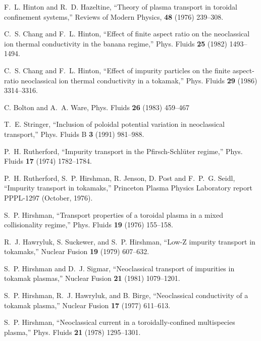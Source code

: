 \begin{thebibliography}{99}

  F.~L. Hinton and R.~D. Hazeltine,
``Theory of plasma transport in toroidal confinement systems,''
Reviews of Modern Physics, {\bf 48} (1976) 239--308.

 C.~S. Chang and F.~L. Hinton,
``Effect of finite aspect ratio on the neoclassical ion thermal 
conductivity in the banana regime,'' 
Phys. Fluids {\bf 25} (1982) 1493--1494.

 C.~S. Chang and F.~L. Hinton,
``Effect of impurity particles on the finite aspect-ratio neoclassical
ion thermal conductivity in a tokamak,''
Phys. Fluids {\bf 29} (1986) 3314--3316.

 C. Bolton and A.~A. Ware,
Phys. Fluids {\bf 26} (1983) 459--467

 T.~E. Stringer,
``Inclusion of poloidal potential variation in neoclassical transport,''
Phys. Fluids B {\bf 3} (1991) 981--988.

 P.~H. Rutherford,
``Impurity transport in the Pfirsch-Schl\"{u}ter regime,''
Phys. Fluids {\bf 17} (1974) 1782--1784.

 P.~H. Rutherford, S.~P. Hirshman, R. Jenson,
D. Post and F.~P.~G. Seidl,
``Impurity transport in tokamaks,''
Princeton Plasma Physics Laboratory report PPPL-1297
(October, 1976).

 S.~P. Hirshman,
``Transport properties of a toroidal plasma in a mixed 
collisionality regime,''
Phys. Fluids {\bf 19} (1976) 155--158.

 R.~J. Hawryluk, S. Suckewer, and S.~P. Hirshman,
``Low-Z impurity transport in tokamaks,''
Nuclear Fusion {\bf 19} (1979) 607--632.

 S.~P. Hirshman and D.~J. Sigmar,
``Neoclassical transport of impurities in tokamak plasmas,''
Nuclear Fusion {\bf 21} (1981) 1079--1201.

 S.~P. Hirshman, R.~J. Hawryluk, and B. Birge,
``Neoclassical conductivity of a tokamak plasma,''
Nuclear Fusion {\bf 17} (1977) 611--613.

 S.~P. Hirshman,
``Neoclassical current in a toroidally-confined multispecies plasma,''
Phys. Fluids {\bf 21} (1978) 1295--1301.


\end{thebibliography}


